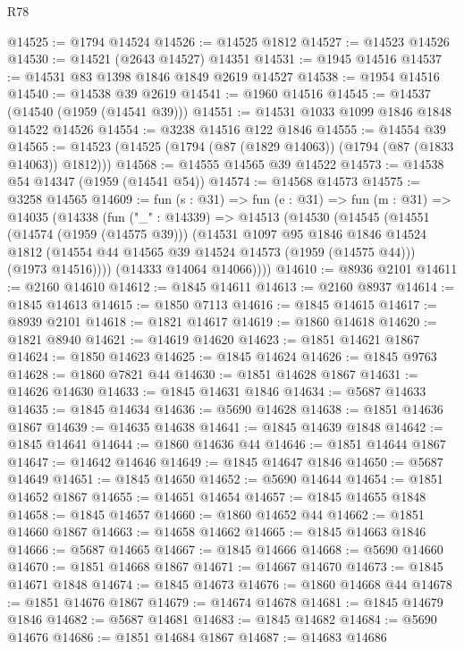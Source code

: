 \begin{lexlean}{R78}
\begin{coremodule}
@14525 := @1794 @14524
@14526 := @14525 @1812
@14527 := @14523 @14526
@14530 := @14521 (@2643 @14527) @14351
@14531 := @1945 @14516
@14537 := @14531 @83 @1398 @1846 @1849 @2619 @14527
@14538 := @1954 @14516
@14540 := @14538 @39 @2619
@14541 := @1960 @14516
@14545 := @14537 (@14540 (@1959 (@14541 @39)))
@14551 := @14531 @1033 @1099 @1846 @1848 @14522 @14526
@14554 := @3238 @14516 @122 @1846
@14555 := @14554 @39
@14565 := @14523 (@14525 (@1794 (@87 (@1829 @14063)) (@1794 (@87 (@1833 @14063)) @1812)))
@14568 := @14555 @14565 @39 @14522
@14573 := @14538 @54 @14347 (@1959 (@14541 @54))
@14574 := @14568 @14573
@14575 := @3258 @14565
@14609 := fun (s : @31) =>
  fun (e : @31) =>
  fun (m : @31) =>
  @14035
    (@14338
      (fun ("_" : @14339) =>
      @14513
        (@14530
          (@14545
            (@14551
              (@14574 (@1959 (@14575 @39)))
              (@14531
                @1097
                @95
                @1846
                @1846
                @14524
                @1812
                (@14554 @44 @14565 @39 @14524 @14573 (@1959 (@14575 @44)))
                (@1973 @14516))))
          (@14333 @14064 @14066))))
@14610 := @8936 @2101
@14611 := @2160 @14610
@14612 := @1845 @14611
@14613 := @2160 @8937
@14614 := @1845 @14613
@14615 := @1850 @7113
@14616 := @1845 @14615
@14617 := @8939 @2101
@14618 := @1821 @14617
@14619 := @1860 @14618
@14620 := @1821 @8940
@14621 := @14619 @14620
@14623 := @1851 @14621 @1867
@14624 := @1850 @14623
@14625 := @1845 @14624
@14626 := @1845 @9763
@14628 := @1860 @7821 @44
@14630 := @1851 @14628 @1867
@14631 := @14626 @14630
@14633 := @1845 @14631 @1846
@14634 := @5687 @14633
@14635 := @1845 @14634
@14636 := @5690 @14628
@14638 := @1851 @14636 @1867
@14639 := @14635 @14638
@14641 := @1845 @14639 @1848
@14642 := @1845 @14641
@14644 := @1860 @14636 @44
@14646 := @1851 @14644 @1867
@14647 := @14642 @14646
@14649 := @1845 @14647 @1846
@14650 := @5687 @14649
@14651 := @1845 @14650
@14652 := @5690 @14644
@14654 := @1851 @14652 @1867
@14655 := @14651 @14654
@14657 := @1845 @14655 @1848
@14658 := @1845 @14657
@14660 := @1860 @14652 @44
@14662 := @1851 @14660 @1867
@14663 := @14658 @14662
@14665 := @1845 @14663 @1846
@14666 := @5687 @14665
@14667 := @1845 @14666
@14668 := @5690 @14660
@14670 := @1851 @14668 @1867
@14671 := @14667 @14670
@14673 := @1845 @14671 @1848
@14674 := @1845 @14673
@14676 := @1860 @14668 @44
@14678 := @1851 @14676 @1867
@14679 := @14674 @14678
@14681 := @1845 @14679 @1846
@14682 := @5687 @14681
@14683 := @1845 @14682
@14684 := @5690 @14676
@14686 := @1851 @14684 @1867
@14687 := @14683 @14686

\end{coremodule}
\end{lexlean}
